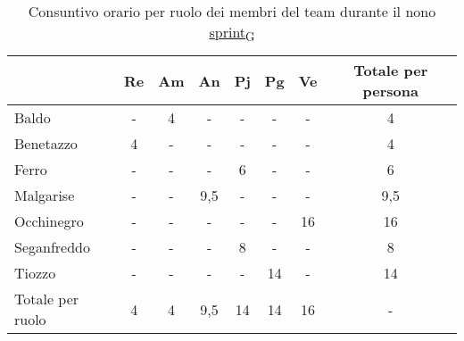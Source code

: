 \begin{table}[!h]
    \centering
    \begin{tabular}{ | l | c | c | c | c | c | c | c | }
        \hline
		\textbf{} & \textbf{Re} & \textbf{Am} &\textbf{An} & \textbf{Pj} & \textbf{Pg} & \textbf{Ve} & \textbf{Totale per persona} \\
		\hline			    %
		Baldo            &  -   &  4   &  -   &  -   &  -   &  -   &  4   \\
		Benetazzo        &  4   &  -   &  -   &  -   &  -   &  -   &  4   \\
		Ferro            &  -   &  -   &  -   &  6   &  -   &  -   &  6   \\
		Malgarise        &  -   &  -   &  9,5 &  -   &  -   &  -   &  9,5 \\
		Occhinegro       &  -   &  -   &  -   &  -   &  -   & 16   & 16   \\
		Seganfreddo      &  -   &  -   &  -   &  8   &  -   &  -   &  8   \\
		Tiozzo           &  -   &  -   &  -   &  -   & 14   &  -   & 14   \\
		\hline
		Totale per ruolo &  4   &  4   &  9,5 & 14   & 14   & 16   &  -   \\
		\hline
    \end{tabular}
    \caption{Consuntivo orario per ruolo dei membri del team durante il nono \href{https://7last.github.io/docs/pb/documentazione-interna/glossario\#sprint}{sprint\textsubscript{G}}}
\end{table}

